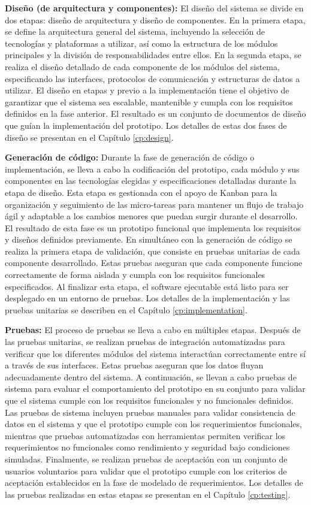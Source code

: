 \textbf{Diseño (de arquitectura y componentes):}
El diseño del sistema se divide en dos etapas: diseño de arquitectura y diseño de componentes.
En la primera etapa, se define la arquitectura general del sistema, incluyendo la selección de tecnologías y plataformas a utilizar, así como la estructura de los módulos principales y la división de responsabilidades entre ellos.
En la segunda etapa, se realiza el diseño detallado de cada componente de los módulos del sistema, especificando las interfaces, protocolos de comunicación y estructuras de datos a utilizar.
El diseño en etapas y previo a la implementación tiene el objetivo de garantizar que el sistema sea escalable, mantenible y cumpla con los requisitos definidos en la fase anterior.
El resultado es un conjunto de documentos de diseño que guían la implementación del prototipo.
Los detalles de estas dos fases de diseño se presentan en el Capítulo \ref{cp:design}.

\textbf{Generación de código:}
Durante la fase de generación de código o implementación, se lleva a cabo la codificación del prototipo, cada módulo y sus componentes en las tecnologías elegidas y especificaciones detalladas durante la etapa de diseño.
Esta etapa es gestionada con el apoyo de Kanban para la organización y seguimiento de las micro-tareas para mantener un flujo de trabajo ágil y adaptable a los cambios menores que puedan surgir durante el desarrollo.
El resultado de esta fase es un prototipo funcional que implementa los requisitos y diseños definidos previamente.
En simultáneo con la generación de código se realiza la primera etapa de validación, que consiste en pruebas unitarias de cada componente desarrollado.
Estas pruebas aseguran que cada componente funcione correctamente de forma aislada y cumpla con los requisitos funcionales especificados.
Al finalizar esta etapa, el software ejecutable está listo para ser desplegado en un entorno de pruebas.
Los detalles de la implementación y las pruebas unitarias se describen en el Capítulo \ref{cp:implementation}.

\textbf{Pruebas:}
El proceso de pruebas se lleva a cabo en múltiples etapas.
Después de las pruebas unitarias, se realizan pruebas de integración automatizadas para verificar que los diferentes módulos del sistema interactúan correctamente entre sí a través de sus interfaces.
Estas pruebas aseguran que los datos fluyan adecuadamente dentro del sistema.
A continuación, se llevan a cabo pruebas de sistema para evaluar el comportamiento del prototipo en su conjunto para validar que el sistema cumple con los requisitos funcionales y no funcionales definidos.
Las pruebas de sistema incluyen pruebas manuales para validar consistencia de datos en el sistema y que el prototipo cumple con los requerimientos funcionales, mientras que pruebas automatizadas con herramientas permiten verificar los requerimientos no funcionales como rendimiento y seguridad bajo condiciones simuladas.
Finalmente, se realizan pruebas de aceptación con un conjunto de usuarios voluntarios para validar que el prototipo cumple con los criterios de aceptación establecidos en la fase de modelado de requerimientos.
Los detalles de las pruebas realizadas en estas etapas se presentan en el Capítulo \ref{cp:testing}.

